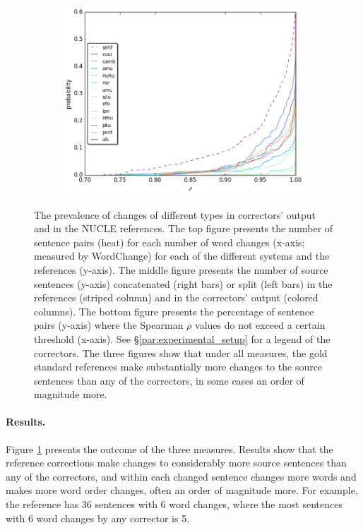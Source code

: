 \documentclass[letter,11pt]{article}
\begin{document}
\begin{figure}
\begin{subfigure}[]{0.4\textwidth}
    \includegraphics[width = \textwidth]{spearman_ecdf}
  \end{subfigure}
  \caption{\label{fig:over-conservatism}
    The prevalence of changes of different types in correctors' output and in the NUCLE references.
    The top figure presents the number of sentence pairs (heat) for each number of word changes
    (x-axis; measured by {\sc WordChange}) for each of the different systems and the references (y-axis).
    The middle figure presents the number of source sentences (y-axis) concatenated (right bars) or split (left bars) in the references (striped column) and in the correctors' output (colored columns).
    The bottom figure presents the percentage of sentence pairs (y-axis) where the
    Spearman $\rho$ values do not exceed a certain threshold (x-axis).
    See \S \ref{par:experimental_setup} for a legend of the correctors.
    The three figures show that under all measures, the gold standard references make
    substantially more changes to the source sentences than any of the correctors,
    in some cases an order of magnitude more.
  }
\end{figure}
\vspace{-.2cm}
\paragraph{Results.}
Figure \ref{fig:over-conservatism} presents the outcome of the three measures. 
Results show that the reference corrections make changes to considerably more source sentences than any of the correctors, and within each changed sentence changes more words and makes more word order changes, often an order of magnitude more. For example, the reference has 36 sentences with 6 word changes, where the most sentences with 6 word changes by any corrector is 5.
\end{document}
